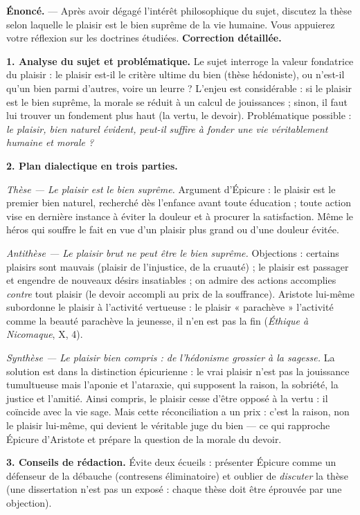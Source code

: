 \documentclass[11pt]{article}
\begin{document}
\begin{exoresolu}
\textbf{Énoncé.} — Après avoir dégagé l'intérêt philosophique du sujet, discutez la thèse selon laquelle le plaisir est le bien suprême de la vie humaine. Vous appuierez votre réflexion sur les doctrines étudiées.
\tcblower
\textbf{Correction détaillée.}

\textbf{1. Analyse du sujet et problématique.} Le sujet interroge la valeur fondatrice du plaisir : le plaisir est-il le critère ultime du bien (thèse hédoniste), ou n'est-il qu'un bien parmi d'autres, voire un leurre ? L'enjeu est considérable : si le plaisir est le bien suprême, la morale se réduit à un calcul de jouissances ; sinon, il faut lui trouver un fondement plus haut (la vertu, le devoir). Problématique possible : \emph{le plaisir, bien naturel évident, peut-il suffire à fonder une vie véritablement humaine et morale ?}

\textbf{2. Plan dialectique en trois parties.}

\emph{Thèse — Le plaisir est le bien suprême.} Argument d'Épicure : le plaisir est le premier bien naturel, recherché dès l'enfance avant toute éducation ; toute action vise en dernière instance à éviter la douleur et à procurer la satisfaction. Même le héros qui souffre le fait en vue d'un plaisir plus grand ou d'une douleur évitée.

\emph{Antithèse — Le plaisir brut ne peut être le bien suprême.} Objections : certains plaisirs sont mauvais (plaisir de l'injustice, de la cruauté) ; le plaisir est passager et engendre de nouveaux désirs insatiables ; on admire des actions accomplies \emph{contre} tout plaisir (le devoir accompli au prix de la souffrance). Aristote lui-même subordonne le plaisir à l'activité vertueuse : le plaisir « parachève » l'activité comme la beauté parachève la jeunesse, il n'en est pas la fin (\emph{Éthique à Nicomaque}, X, 4).

\emph{Synthèse — Le plaisir bien compris : de l'hédonisme grossier à la sagesse.} La solution est dans la distinction épicurienne : le vrai plaisir n'est pas la jouissance tumultueuse mais l'aponie et l'ataraxie, qui supposent la raison, la sobriété, la justice et l'amitié. Ainsi compris, le plaisir cesse d'être opposé à la vertu : il coïncide avec la vie sage. Mais cette réconciliation a un prix : c'est la raison, non le plaisir lui-même, qui devient le véritable juge du bien — ce qui rapproche Épicure d'Aristote et prépare la question de la morale du devoir.

\textbf{3. Conseils de rédaction.} Évite deux écueils : présenter Épicure comme un défenseur de la débauche (contresens éliminatoire) et oublier de \emph{discuter} la thèse (une dissertation n'est pas un exposé : chaque thèse doit être éprouvée par une objection).
\end{exoresolu}
\end{document}
